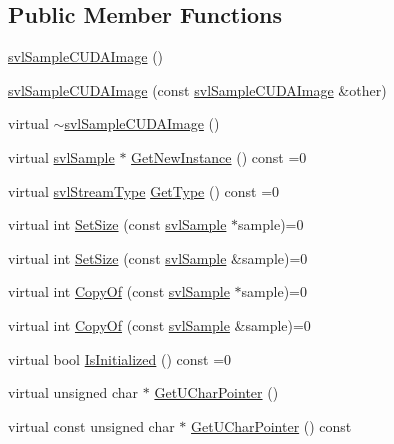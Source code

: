 \subsection*{Public Member Functions}
\begin{DoxyCompactItemize}
\item 
\hyperlink{classsvl_sample_c_u_d_a_image_aaebbc3a6bbe8c16fb8ea14a3c06dd22f}{svl\-Sample\-C\-U\-D\-A\-Image} ()
\item 
\hyperlink{classsvl_sample_c_u_d_a_image_a32086b37f8d2e76098187547a67a58bb}{svl\-Sample\-C\-U\-D\-A\-Image} (const \hyperlink{classsvl_sample_c_u_d_a_image}{svl\-Sample\-C\-U\-D\-A\-Image} \&other)
\item 
virtual \hyperlink{classsvl_sample_c_u_d_a_image_a17ed19c29869601db5c180703ed1fd48}{$\sim$svl\-Sample\-C\-U\-D\-A\-Image} ()
\item 
virtual \hyperlink{classsvl_sample}{svl\-Sample} $\ast$ \hyperlink{classsvl_sample_c_u_d_a_image_a5d7500f6a102241bb5d4722cd6f2d147}{Get\-New\-Instance} () const =0
\item 
virtual \hyperlink{svl_definitions_8h_aa00696d338a58db361335a01fd11e122}{svl\-Stream\-Type} \hyperlink{classsvl_sample_c_u_d_a_image_a9f207b0e1b0ef08d839acbe9fdac64c3}{Get\-Type} () const =0
\item 
virtual int \hyperlink{classsvl_sample_c_u_d_a_image_a492f7179e526a5931c5f0f3c84394677}{Set\-Size} (const \hyperlink{classsvl_sample}{svl\-Sample} $\ast$sample)=0
\item 
virtual int \hyperlink{classsvl_sample_c_u_d_a_image_afb8a430a19e60edf45d68556513b543c}{Set\-Size} (const \hyperlink{classsvl_sample}{svl\-Sample} \&sample)=0
\item 
virtual int \hyperlink{classsvl_sample_c_u_d_a_image_a5d0e37569f6898f1a5595ecf00216e17}{Copy\-Of} (const \hyperlink{classsvl_sample}{svl\-Sample} $\ast$sample)=0
\item 
virtual int \hyperlink{classsvl_sample_c_u_d_a_image_ac4ad6e11ebd3a3c36c09658a1b72d55f}{Copy\-Of} (const \hyperlink{classsvl_sample}{svl\-Sample} \&sample)=0
\item 
virtual bool \hyperlink{classsvl_sample_c_u_d_a_image_ae1c901a8f2628191096b70789ec9253d}{Is\-Initialized} () const =0
\item 
virtual unsigned char $\ast$ \hyperlink{classsvl_sample_c_u_d_a_image_af5920ea9804f0d8e9c0eb6a05d525b5b}{Get\-U\-Char\-Pointer} ()
\item 
virtual const unsigned char $\ast$ \hyperlink{classsvl_sample_c_u_d_a_image_ac934fb0fc4bfa36edd6844b2c1a33c9d}{Get\-U\-Char\-Pointer} () const 

\end{DoxyCompactItemize}
